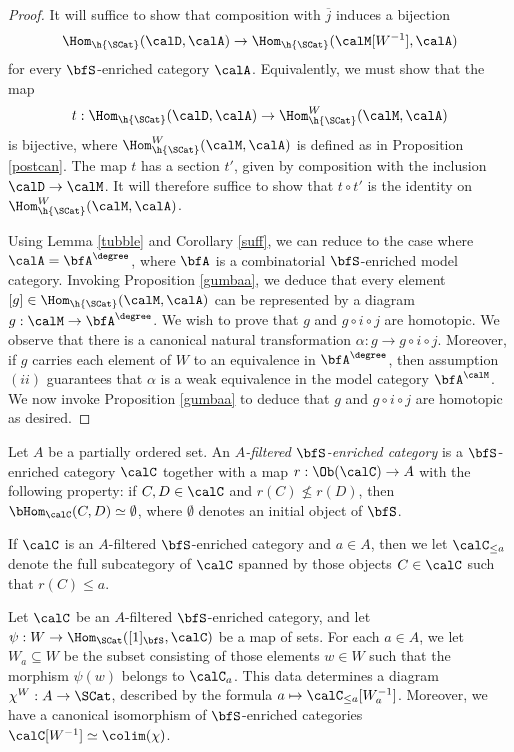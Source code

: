 \begin{proof}
It will suffice to show that composition with $\overline{j}$ induces a bijection
$$ \Hom_{ \h{\SCat} }( \calD, \calA) \rightarrow \Hom_{ \h{\SCat}}( \calM[W^{-1}], \calA)$$
for every $\bfS$-enriched category $\calA$. Equivalently, we must show that the map $$t: \Hom_{\h{\SCat}}( \calD, \calA) \rightarrow \Hom^{W}_{\h{\SCat}}(\calM, \calA)$$
is bijective, where $\Hom_{\h{\SCat}}^{W}( \calM, \calA)$ is defined as in Proposition \ref{postcan}.
The map $t$ has a section $t'$, given by composition with the inclusion $\calD \rightarrow \calM$.
It will therefore suffice to show that $t \circ t'$ is the identity on $\Hom_{\h{\SCat}}^{W}(\calM, \calA)$. 

Using Lemma \ref{tubble} and Corollary \ref{suff}, we can reduce to the case where $\calA = \bfA^{\degree}$, where $\bfA$ is a combinatorial $\bfS$-enriched model category. Invoking Proposition \ref{gumbaa}, we deduce that every element $[g] \in \Hom_{\h{\SCat}}( \calM, \calA)$ can be represented
by a diagram $g: \calM \rightarrow \bfA^{\degree}$. We wish to prove that
$g$ and $g \circ i \circ j$ are homotopic. We observe that there is a canonical natural transformation $\alpha: g \rightarrow g \circ i \circ j$. Moreover, if $g$ carries
each element of $W$ to an equivalence in $\bfA^{\degree}$, then assumption
$(ii)$ guarantees that $\alpha$ is a weak equivalence in the model category $\bfA^{\calM}$. We now invoke Proposition \ref{gumbaa} to deduce that $g$ and $g \circ i \circ j$ are homotopic as desired.
\end{proof}

\begin{definition}
Let $A$ be a partially ordered set. An {\it $A$-filtered $\bfS$-enriched category}
is a $\bfS$-enriched category $\calC$ together with a map $r: \Ob(\calC) \rightarrow A$
with the following property: if $C, D \in \calC$ and $r(C) \nleq r(D)$, then
$\bHom_{\calC}(C,D) \simeq \emptyset$, where $\emptyset$ denotes an initial object of $\bfS$.

If $\calC$ is an $A$-filtered $\bfS$-enriched category and $a \in A$, then we let
$\calC_{\leq a}$ denote the full subcategory of $\calC$ spanned by those objects
$C \in \calC$ such that $r(C) \leq a$.
\end{definition}

\begin{remark}\label{sabreton}
Let $\calC$ be an $A$-filtered $\bfS$-enriched category, and let
$\psi: W \rightarrow \Hom_{\SCat}( [1]_{\bfS}, \calC)$ be a map of sets.
For each $a \in A$, we let $W_{a} \subseteq W$ be the subset
consisting of those elements $w \in W$ such that the morphism
$\psi(w)$ belongs to $\calC_{a}$. This data determines a diagram
$\chi^{W}: A \rightarrow \SCat$, described by the formula
$a \mapsto \calC_{\leq a}[ W_{a}^{-1} ]$. Moreover, we have a canonical isomorphism
of $\bfS$-enriched categories $\calC[W^{-1}] \simeq \colim(\chi)$.
\end{remark}

